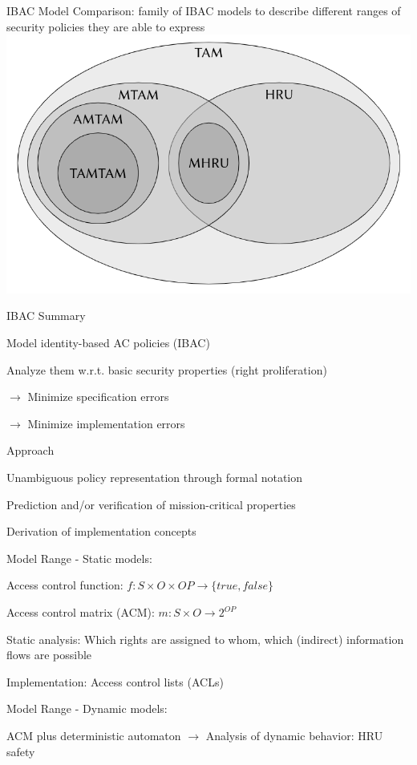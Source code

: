 \documentclass[a4paper]{article}
\begin{document}
\begin{multicols}{3}
    IBAC Model Comparison: family of IBAC models to describe different ranges of security policies they are able to express
    \includegraphics[width=.5\linewidth]{Assets/Systemsicherheit-ibac-model-comparison.png}

    IBAC Summary
    \begin{itemize*}
        \item Model identity-based AC policies (IBAC)
        \item Analyze them w.r.t. basic security properties (right proliferation)
        \item[$\rightarrow$] Minimize specification errors
        \item[$\rightarrow$] Minimize implementation errors
        \item Approach
        \begin{itemize*}
            \item Unambiguous policy representation through formal notation
            \item Prediction and/or verification of mission-critical properties
            \item Derivation of implementation concepts
        \end{itemize*}
        \item Model Range - Static models:
        \begin{itemize*}
            \item Access control function: $f:S\times O\times OP\rightarrow \{true,false\}$
            \item Access control matrix (ACM): $m:S\times O\rightarrow 2^{OP}$
            \item Static analysis: Which rights are assigned to whom, which (indirect) information flows are possible
            \item Implementation: Access control lists (ACLs)
        \end{itemize*}
        \item Model Range - Dynamic models:
        \begin{itemize*}
            \item ACM plus deterministic automaton $\rightarrow$ Analysis of dynamic behavior: HRU safety

\end{itemize*}
\end{itemize*}
\end{multicols}
\end{document}
